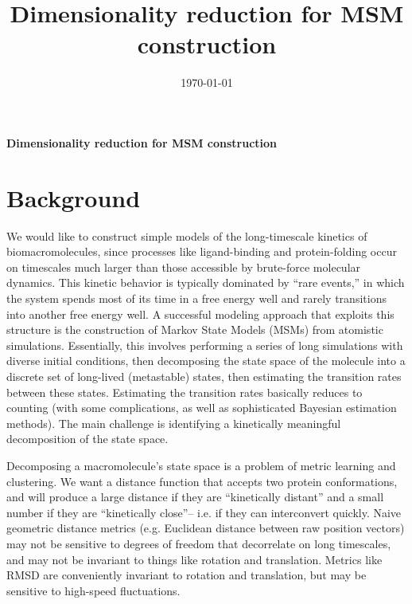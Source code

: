 \documentclass[aps,prl,preprint,nofootinbib,superscriptaddress,linenumbers]{revtex4-1}
\begin{document}

\title{Dimensionality reduction for MSM construction}
\date{\today}




\begin{center}
\textbf{Dimensionality reduction for MSM construction}
\end{center}

\section{Background}
We would like to construct simple models of the long-timescale kinetics of biomacromolecules, since processes like ligand-binding and protein-folding occur on timescales much larger than those accessible by brute-force molecular dynamics.
This kinetic behavior is typically dominated by ``rare events,'' in which the system spends most of its time in a free energy well and rarely transitions into another free energy well.
A successful modeling approach that exploits this structure is the construction of Markov State Models (MSMs) from atomistic simulations.
Essentially, this involves performing a series of long simulations with diverse initial conditions, then decomposing the state space of the molecule into a discrete set of long-lived (metastable) states, then estimating the transition rates between these states.
Estimating the transition rates basically reduces to counting (with some complications, as well as sophisticated Bayesian estimation methods).
The main challenge is identifying a kinetically meaningful decomposition of the state space.

Decomposing a macromolecule's state space is a problem of metric learning and clustering. We want a distance function that accepts two protein conformations, and will produce a large distance if they are ``kinetically distant'' and a small number if they are ``kinetically close''-- i.e. if they can interconvert quickly. Naive geometric distance metrics (e.g. Euclidean distance between raw position vectors) may not be sensitive to degrees of freedom that decorrelate on long timescales, and may not be invariant to things like rotation and translation. Metrics like RMSD are conveniently invariant to rotation and translation, but may be sensitive to high-speed fluctuations.
\end{document}
